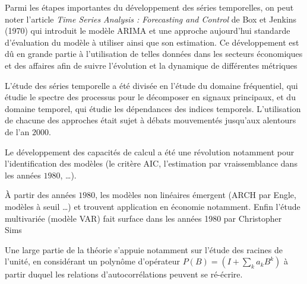 

\smallskip

Parmi les étapes importantes du développement des séries temporelles, on peut noter l'article \emph{Time Series Analysis : Forecasting and Control} de Box et Jenkins (1970) qui introduit le modèle ARIMA et une approche aujourd'hui standarde d'évaluation du modèle à utiliser ainsi que son estimation. Ce développement est dû en grande partie à l'utilisation de telles données dans les secteurs économiques et des affaires afin de suivre l'évolution et la dynamique de différentes métriques

\smallskip

L'étude des séries temporelle a été divisée en l'étude du domaine fréquentiel, qui étudie le spectre des processus pour le décomposer en signaux principaux, et du domaine temporel, qui étudie les dépendances des indices temporels. L'utilisation de chacune des approches était sujet à débats mouvementés jusqu'aux alentours de l'an $2000$.

\smallskip

Le développement des capacités de calcul a été une révolution notamment pour l'identification des modèles (le critère AIC, l'estimation par vraissemblance dans les années $1980$, \ldots).

\smallskip

À partir des années $1980$, les modèles non linéaires émergent (ARCH par Engle, modèles à seuil \ldots) et trouvent application en économie notamment. Enfin l'étude multivariée (modèle VAR) fait surface dans les années 1980 par Christopher Sims~\cite[ \href{https://pubs.aeaweb.org/doi/pdf/10.1257/jep.15.4.101}{lien de l'article} ]{VAR_paper}

\smallskip

Une large partie de la théorie s'appuie notamment sur l'étude des racines de l'unité, en considérant un polynôme d'opérateur $P(B) = (I + \sum_k a_k B^k)$ à partir duquel les relations d'autocorrélations peuvent se ré-écrire.
